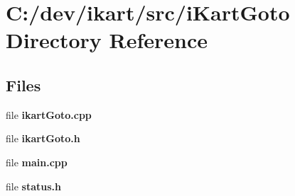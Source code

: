 \section{C\+:/dev/ikart/src/i\+Kart\+Goto Directory Reference}
\label{dir_1f1b800b93334c439b3cc6665b68b74f}
\subsection*{Files}
\begin{DoxyCompactItemize}
\item 
file {\bfseries ikart\+Goto.\+cpp}
\item 
file {\bfseries ikart\+Goto.\+h}
\item 
file {\bfseries main.\+cpp}
\item 
file {\bfseries status.\+h}
\end{DoxyCompactItemize}
